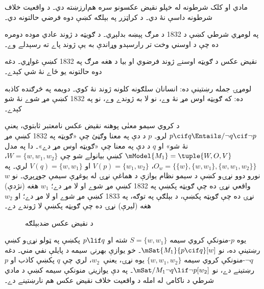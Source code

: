 \documentclass[../../../include/open-logic-section]{subfiles}
\begin{document}


مادي او کلک شرطونه له خپلو نقيض عکسونو سره هم‌ارزښته دي۔
د واقعيت خلاف شرطونه داسې نۀ دي۔ د کراټزر په بېلګه کښې دوه فرضي حالتونه دي۔
\begin{explain}
  په لومړي شرطي کښې د 1832 د مرګ پېښه بدلېږي۔ د ګويټه د
  ژوند عادي موده دومره ده چې د اوسني وخت تر رارسېدو وړاندې
  به يې ژوند پاے ته رسېدلے وے۔

  نقيض عکس د ګويټه اوسنے ژوند فرضوي او بيا د هغه مرګ په
  1832 کښې غواړي۔ دغه دوه حالتونه يو ځاے نۀ شي کېدے۔
\end{explain}
لومړۍ جمله رښتينې ده: انسانان سلګونه کلونه ژوند نۀ کوي۔
دويمه په څرګنده کاذبه ده: که ګويټه اوس مړ نۀ وے، نو لا به
ژوندے وے، نو په 1832 کښې مړ شوے نۀ شو کېدے۔

\begin{ex}
  د کروي سيمو معنٰی پوهنه نقيض عکس نامعتبر ثابتوي، يعنې $p
  \cif q \Entails/ \lnot q \cif \lnot p$ لرو۔ $p$ د دې په معنا
  وګڼئ چې «ګويټه په 1832 کښې مړ نۀ شو» او $q$ د دې په معنا
  چې «ګويټه اوس مړ دے»۔ دا په مدل $\mModel{M_1} = \tuple{W, O, V}$
  کښې بيانولے شو چې $W =
  \{w, w_1, w_2\}$، $O_w = \{\{w\}, \{w, w_1\}, \{w, w_1, w_2\}\}$،
  $V(p) = \{w_1, w_2\}$ او $V(q) = \{w, w_1\}$ لري۔ په نورو
  دوو نړۍو کښې د سيمو نظام يوازې د هماغې نړۍ له يوغړې سيمې
  جوړېږي۔ نو $w$ واقعي نړۍ ده چې ګويټه پکښې په 1832 کښې مړ شوے
  او لا مړ دے؛ $w_1$ هغه (نژدې) نړۍ ده چې ګويټه پکښې، د
  بېلګې په توګه، په 1833 کښې مړ شوے او لا مړ دے؛ او $w_2$
  هغه (ليرې) نړۍ ده چې ګويټه پکښې لا ژوندے دے۔
\begin{figure}
\begin{center}
\caption{د نقيض عکس ضدبېلګه}
\end{center}
\end{figure}
يوه $p$-منونکې کروي سيمه $S =
\{w, w_1\}$ شته او $p \lif q$ پکښې په ټولو نړۍو کښې رښتينې
ده، نو $\mSat{M_1}{p
  \cif q}[w]$۔ خو يوازې بهرنۍ سيمه د پايلې نفي مني۔
دغه $\lnot q$-منونکې
کروي سيمه $\{w, w_1,
w_2\}$ يوه نړۍ، يعنې~$w_2$، لري چې $q$ پکښې کاذب او $p$
رښتينے دے، نو $\mSat/{M_1}{\lnot q \lif \lnot p}[w_2]$۔
په دې يوازينۍ منونکې سيمه کښې د مادي شرطي د ناکامۍ له امله
د واقعيت خلاف نقيض عکس هم نارښتينے دے۔
\end{ex}
\end{document}
